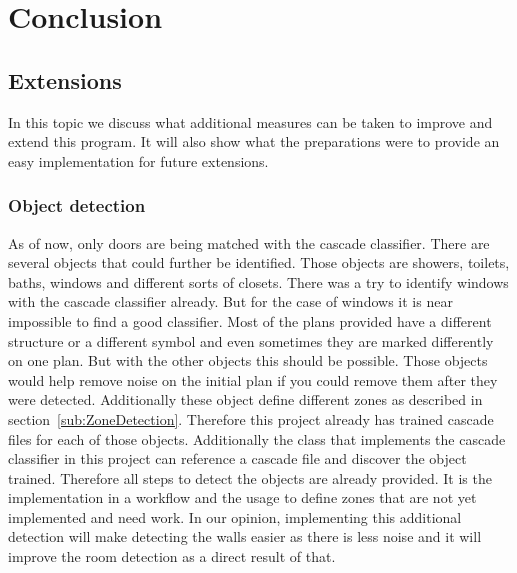 \section{Conclusion}
\subsection{Extensions}
In this topic we discuss what additional measures can be taken to improve and extend this program. It will also show what the preparations were to provide an easy implementation for future extensions.

\subsubsection{Object detection}
\label{sub:FutureObjectDetection}
As of now, only doors are being matched with the cascade classifier. There are several objects that could further be identified. Those objects are showers, toilets, baths, windows and different sorts of closets.
There was a try to identify windows with the cascade classifier already. But for the case of windows it is near impossible to find a good classifier. Most of the plans provided have a different structure or a different symbol and even sometimes they are marked differently on one plan. But with the other objects this should be possible. Those objects would help remove noise on the initial plan if you could remove them after they were detected. Additionally these object define different zones as described in section~\ref{sub:ZoneDetection}. Therefore this project already has trained cascade files for each of those objects. Additionally the class that implements the cascade classifier in this project can reference a cascade file and discover the object trained. Therefore all steps to detect the objects are already provided. It is the implementation in a workflow and the usage to define zones that are not yet implemented and need work. In our opinion, implementing this additional detection will make detecting the walls easier as there is less noise and it will improve the room detection as a direct result of that.

